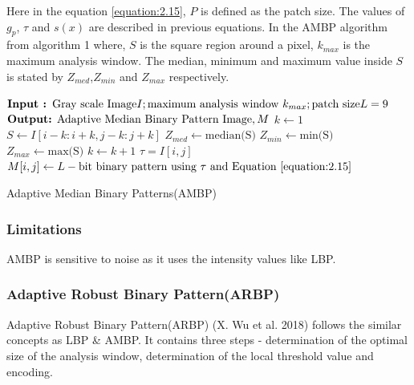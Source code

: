 \documentclass[12pt]{article}
\begin{document}
Here in the equation \ref{equation:2.15}, $P$ is defined as the patch size. The values of $g_p$, $\tau$ and $s(x)$ are described in previous equations. In the AMBP algorithm from algorithm 1 where, $S$ is the square region around a pixel, $k_{max}$ is the maximum analysis window. The median, minimum and maximum value inside $S$ is stated by $Z_{med}$,$Z_{min}$ and $Z_{max}$ respectively.
\begin{algorithm}
	$\text{\textbf{Input : }Gray scale Image} I; \text{maximum analysis window }k_{max}; \text{patch size} L = 9$\;
	$\text{\textbf{Output:} Adaptive Median Binary Pattern Image}, M$\;
	{
			$k \gets 1$ \;
			{
					$S \gets I[i-k:i+k, j-k : j+k]$ \;
					$Z_{med} \gets \text{median(S)}$ \;
					$Z_{min} \gets \text{min(S)}$\;
					$Z_{max} \gets \text{max(S)}$\;
					$k \gets k+1$ \;	
			}
		{$\tau = I[i,j]$}
		$M[i,j] \gets L-\text{bit binary pattern using } \tau \text{ and Equation } \ref{equation:2.15}$
			\label{algo:1}		
	}

	\caption{Adaptive Median Binary Patterns(AMBP)}
\end{algorithm}

\subsubsection*{Limitations}
AMBP is sensitive to noise as it uses the intensity values like LBP.\\

\subsubsection{Adaptive Robust Binary Pattern(ARBP)}
Adaptive Robust Binary Pattern(ARBP) (X. Wu et al. 2018)\cite{arbp01} follows the similar concepts as LBP \& AMBP. It contains three steps - determination of the optimal size of the analysis window, determination of the local threshold value and encoding.
\end{document}
